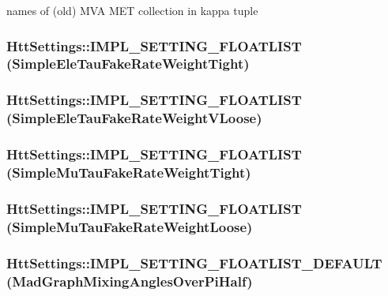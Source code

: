 names of (old) MVA MET collection in kappa tuple \hypertarget{classHttSettings_a4f17d6b910aa47d38dcdb308ab4c348b}{
\subsubsection[{IMPL\_\-SETTING\_\-FLOATLIST}]{\setlength{\rightskip}{0pt plus 5cm}HttSettings::IMPL\_\-SETTING\_\-FLOATLIST (SimpleEleTauFakeRateWeightTight)}}
\label{classHttSettings_a4f17d6b910aa47d38dcdb308ab4c348b}
\hypertarget{classHttSettings_a6b502d2417fae961ed7fd52ada54179e}{
\subsubsection[{IMPL\_\-SETTING\_\-FLOATLIST}]{\setlength{\rightskip}{0pt plus 5cm}HttSettings::IMPL\_\-SETTING\_\-FLOATLIST (SimpleEleTauFakeRateWeightVLoose)}}
\label{classHttSettings_a6b502d2417fae961ed7fd52ada54179e}
\hypertarget{classHttSettings_aa818a821ac07f57f4b55254fa1352b19}{
\subsubsection[{IMPL\_\-SETTING\_\-FLOATLIST}]{\setlength{\rightskip}{0pt plus 5cm}HttSettings::IMPL\_\-SETTING\_\-FLOATLIST (SimpleMuTauFakeRateWeightTight)}}
\label{classHttSettings_aa818a821ac07f57f4b55254fa1352b19}
\hypertarget{classHttSettings_ae3eaf2427a38dc155a300447701af998}{
\subsubsection[{IMPL\_\-SETTING\_\-FLOATLIST}]{\setlength{\rightskip}{0pt plus 5cm}HttSettings::IMPL\_\-SETTING\_\-FLOATLIST (SimpleMuTauFakeRateWeightLoose)}}
\label{classHttSettings_ae3eaf2427a38dc155a300447701af998}
\hypertarget{classHttSettings_acfacd3fac8bcf39c9d542077f20b540c}{
\subsubsection[{IMPL\_\-SETTING\_\-FLOATLIST\_\-DEFAULT}]{\setlength{\rightskip}{0pt plus 5cm}HttSettings::IMPL\_\-SETTING\_\-FLOATLIST\_\-DEFAULT (MadGraphMixingAnglesOverPiHalf)}}
